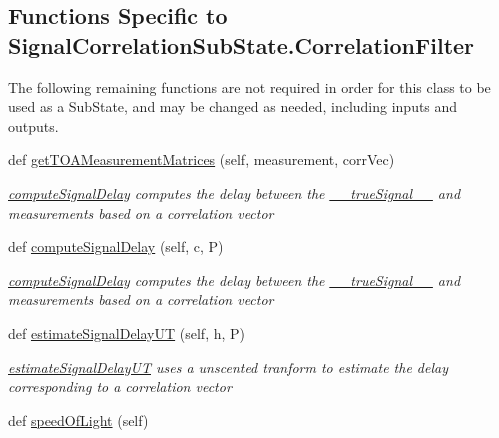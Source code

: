 \subsection*{Functions Specific to Signal\+Correlation\+Sub\+State.\+Correlation\+Filter}
\label{_amgrpb9fa21aa95ba3ab05a0dfc16edccddcd}%
The following remaining functions are not required in order for this class to be used as a Sub\+State, and may be changed as needed, including inputs and outputs.\begin{DoxyCompactItemize}
\item 
def \hyperlink{classSignalCorrelationSubstate_1_1CorrelationFilter_aa3ce889ae348140fca8acd0fc75ea9a0}{get\+T\+O\+A\+Measurement\+Matrices} (self, measurement, corr\+Vec)
\begin{DoxyCompactList}\small\item\em \hyperlink{classSignalCorrelationSubstate_1_1CorrelationFilter_ace04b6e310f321192715c76ec2ac6b52}{compute\+Signal\+Delay} computes the delay between the \hyperlink{classSignalCorrelationSubstate_1_1CorrelationFilter_a5f777d3a877658a1365ebac65b9ab25b}{\+\_\+\+\_\+true\+Signal\+\_\+\+\_\+} and measurements based on a correlation vector \end{DoxyCompactList}\item 
def \hyperlink{classSignalCorrelationSubstate_1_1CorrelationFilter_ace04b6e310f321192715c76ec2ac6b52}{compute\+Signal\+Delay} (self, c, P)
\begin{DoxyCompactList}\small\item\em \hyperlink{classSignalCorrelationSubstate_1_1CorrelationFilter_ace04b6e310f321192715c76ec2ac6b52}{compute\+Signal\+Delay} computes the delay between the \hyperlink{classSignalCorrelationSubstate_1_1CorrelationFilter_a5f777d3a877658a1365ebac65b9ab25b}{\+\_\+\+\_\+true\+Signal\+\_\+\+\_\+} and measurements based on a correlation vector \end{DoxyCompactList}\item 
def \hyperlink{classSignalCorrelationSubstate_1_1CorrelationFilter_aa9e1991566655a89ed084b6918cfb278}{estimate\+Signal\+Delay\+UT} (self, h, P)
\begin{DoxyCompactList}\small\item\em \hyperlink{classSignalCorrelationSubstate_1_1CorrelationFilter_aa9e1991566655a89ed084b6918cfb278}{estimate\+Signal\+Delay\+UT} uses a unscented tranform to estimate the delay corresponding to a correlation vector \end{DoxyCompactList}\item 
def \hyperlink{classSignalCorrelationSubstate_1_1CorrelationFilter_aae801ac673e939678f865f9c0dc23d55}{speed\+Of\+Light} (self)

\end{DoxyCompactItemize}
